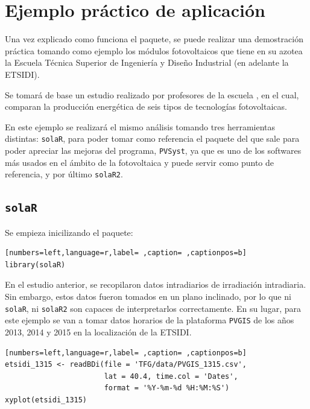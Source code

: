 \chapter{Ejemplo práctico de aplicación}
\label{chap:ejemplo-practico-aplicacion}
Una vez explicado como funciona el paquete, se puede realizar una demostración práctica tomando como ejemplo los módulos fotovoltaicos que tiene en su azotea la Escuela Técnica Superior de Ingeniería y Diseño Industrial (en adelante la ETSIDI).

Se tomará de base un estudio realizado por profesores de la escuela \cite{adrada17}, en el cual, comparan la producción energética de seis tipos de tecnologías fotovoltaicas.

En este ejemplo se realizará el mismo análisis tomando tres herramientas distintas: \texttt{solaR}, para poder tomar como referencia el paquete del que sale para poder apreciar las mejoras del programa, \texttt{PVSyst}, ya que es uno de los softwares más usados en el ámbito de la fotovoltaica y puede servir como punto de referencia, y por último \texttt{solaR2}.

\section{\texttt{solaR}}
\label{sec:orge8d62b7}
\label{sec:solaR}
Se empieza inicilizando el paquete:
\begin{lstlisting}[numbers=left,language=r,label= ,caption= ,captionpos=b]
library(solaR)
\end{lstlisting}

En el estudio anterior, se recopilaron datos intradiarios de irradiación intradiaria. Sin embargo, estos datos fueron tomados en un plano inclinado, por lo que ni \texttt{solaR}, ni \texttt{solaR2} son capaces de interpretarlos correctamente. En su lugar, para este ejemplo se van a tomar datos horarios de la plataforma \texttt{PVGIS} \cite{pvgis} de los años 2013, 2014 y 2015 en la localización de la ETSIDI.
\begin{lstlisting}[numbers=left,language=r,label= ,caption= ,captionpos=b]
etsidi_1315 <- readBDi(file = 'TFG/data/PVGIS_1315.csv',
                       lat = 40.4, time.col = 'Dates',
                       format = '%Y-%m-%d %H:%M:%S')
xyplot(etsidi_1315)
\end{lstlisting}

